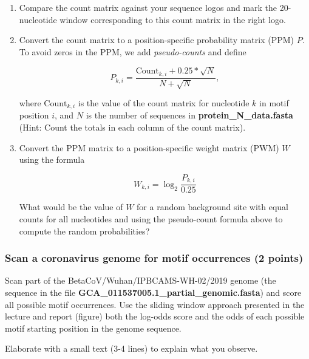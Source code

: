 \documentclass[
  a4paper,
  DIV=11,
  numbers=noendperiod]{scrartcl}
\begin{document}
\begin{enumerate}
\def\labelenumi{\arabic{enumi}.}
\item
  Compare the count matrix against your sequence logos and mark the
  20-nucleotide window corresponding to this count matrix in the right
  logo.
\item
  Convert the count matrix to a position-specific probability matrix
  (PPM) \(P\). To avoid zeros in the PPM, we add \emph{pseudo-counts}
  and define

  \[
  P_{k,i} = \frac{\text{Count}_{k,i} + 0.25 * \sqrt{N}}{N + \sqrt{N}},
  \]

  where \(\text{Count}_{k,i}\) is the value of the count matrix for
  nucleotide \(k\) in motif position \(i\), and \(N\) is the number of
  sequences in \textbf{protein\_N\_data.fasta} (Hint: Count the totals
  in each column of the count matrix).
\item
  Convert the PPM matrix to a position-specific weight matrix (PWM)
  \(W\) using the formula

  \[
  W_{k,i} = \log_2 \frac{P_{k,i}}{0.25}
  \]

  What would be the value of \(W\) for a random background site with
  equal counts for all nucleotides and using the pseudo-count formula
  above to compute the random probabilities?
\end{enumerate}

\hypertarget{scan-a-coronavirus-genome-for-motif-occurrences-2-points}{%
\subsubsection{Scan a coronavirus genome for motif occurrences (2
points)}\label{scan-a-coronavirus-genome-for-motif-occurrences-2-points}}

Scan part of the BetaCoV/Wuhan/IPBCAMS-WH-02/2019 genome (the sequence
in the file \textbf{GCA\_011537005.1\_partial\_genomic.fasta}) and score
all possible motif occurrences. Use the sliding window approach
presented in the lecture and report (figure) both the log-odds score and
the odds of each possible motif starting position in the genome
sequence.

Elaborate with a small text (3-4 lines) to explain what you observe.
\end{document}
